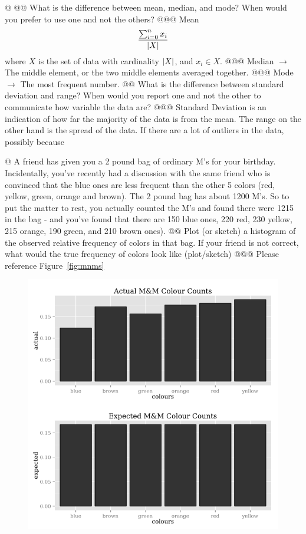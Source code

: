 \documentclass[10pt]{article}
\begin{document}
\begin{easylist}[enumerate]
    @
    @@ What is the difference between mean, median, and mode? When would you prefer to use one and not the others?
    @@@ Mean \[ \frac{\sum^n_{i=0} x_i}{\left\lvert X \right\rvert} \] where $X$ is the set of data with cardinality $\left\lvert X \right\rvert$, and $x_i \in X$.
    @@@ Median $\to$ The middle element, or the two middle elements averaged together.
    @@@ Mode $\to$ The most frequent number.
    @@ What is the difference between standard deviation and range? When would you report one and not the other to communicate how variable the data are?
    @@@ Standard Deviation is an indication of how far the majority of the data is from the mean. The range on the other hand is the spread of the data. If there are a lot of outliers in the data, possibly because 

    @ A friend has given you a 2 pound bag of ordinary M\@M's for your birthday. Incidentally, you've recently had a discussion with the same friend who is convinced that the blue ones are less frequent than the other 5 colors (red, yellow, green, orange and brown). The 2 pound bag has about 1200 M\@M's. So to put the matter to rest, you actually counted the M\@M's and found there were 1215 in the bag - and you've found that there are 150 blue ones, 220 red, 230 yellow, 215 orange, 190 green, and 210 brown ones).
    @@ Plot (or sketch) a histogram of the observed relative frequency of colors in that bag. If your friend is not correct, what would the true frequency of colors look like (plot/sketch)
    @@@ Please reference Figure~\ref{fig:mnms}
        \begin{figure}[ht]
            \centering
            \includegraphics[scale=0.5]{./img/4.png}

\end{figure}
\end{easylist}
\end{document}
